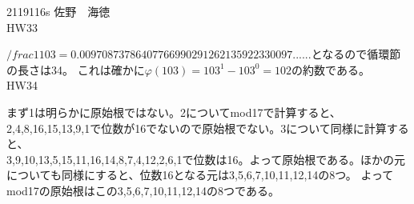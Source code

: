 \documentclass[11pt]{article}
\begin{document}
2119116s 佐野　海徳\\
HW33
\par $/frac{1}{103} = 0.00970873786407766990291262135922330097......$となるので循環節の長さは34。
これは確かに$\varphi(103) = 103^1 - 103^0 = 102$の約数である。\\
HW34
\par まず1は明らかに原始根ではない。2についてmod17で計算すると、2,4,8,16,15,13,9,1で位数が16でないので原始根でない。3について同様に計算すると、\\
3,9,10,13,5,15,11,16,14,8,7,4,12,2,6,1で位数は16。よって原始根である。ほかの元についても同様にすると、位数16となる元は3,5,6,7,10,11,12,14の8つ。
よってmod17の原始根はこの3,5,6,7,10,11,12,14の8つである。
\end{document}
